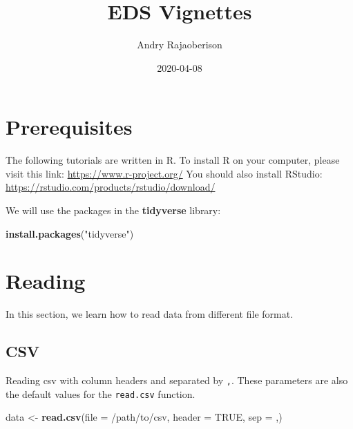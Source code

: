 \documentclass[
]{book}
\title{EDS Vignettes}
\author{Andry Rajaoberison}
\date{2020-04-08}
\newenvironment{Shaded}{\begin{snugshade}}{\end{snugshade}}
\newcommand{\DataTypeTok}[1]{\textcolor[rgb]{0.13,0.29,0.53}{#1}}
\newcommand{\KeywordTok}[1]{\textcolor[rgb]{0.13,0.29,0.53}{\textbf{#1}}}
\newcommand{\NormalTok}[1]{#1}
\newcommand{\OtherTok}[1]{\textcolor[rgb]{0.56,0.35,0.01}{#1}}
\newcommand{\StringTok}[1]{\textcolor[rgb]{0.31,0.60,0.02}{#1}}
\begin{document}
\maketitle

{
\setcounter{tocdepth}{1}
\tableofcontents
}
\hypertarget{prerequisites}{%
\chapter*{Prerequisites}\label{prerequisites}}

The following tutorials are written in R. To install R on your computer, please visit this link: \url{https://www.r-project.org/}
You should also install RStudio: \url{https://rstudio.com/products/rstudio/download/}

We will use the packages in the \textbf{tidyverse} library:

\begin{Shaded}
\begin{Highlighting}[]
\KeywordTok{install.packages}\NormalTok{(}\StringTok{"tidyverse"}\NormalTok{)}
\end{Highlighting}
\end{Shaded}

\hypertarget{reading}{%
\chapter{Reading}\label{reading}}

In this section, we learn how to read data from different file format.

\hypertarget{csv}{%
\section{CSV}\label{csv}}

Reading csv with column headers and separated by \texttt{,}. These parameters are also the default values for the \texttt{read.csv} function.

\begin{Shaded}
\begin{Highlighting}[]
\NormalTok{data \textless{}{-}}\StringTok{ }\KeywordTok{read.csv}\NormalTok{(}\DataTypeTok{file =} \StringTok{\textquotesingle{}/path/to/csv\textquotesingle{}}\NormalTok{, }\DataTypeTok{header =} \OtherTok{TRUE}\NormalTok{, }\DataTypeTok{sep =} \StringTok{\textquotesingle{},\textquotesingle{}}\NormalTok{)}
\end{Highlighting}
\end{Shaded}
\end{document}
